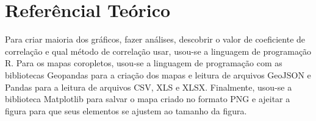 \chapter{Referêncial Teórico}

Para criar maioria dos gráficos, fazer análises, descobrir o valor de coeficiente de correlação e qual método de correlação usar, usou-se a linguagem de programação R. Para os mapas coropletos, usou-se a linguagem de programação com as bibliotecas Geopandas para a criação dos mapas e leitura de arquivos GeoJSON e Pandas para a leitura de arquivos CSV, XLS e XLSX. Finalmente, usou-se a biblioteca  Matplotlib para salvar o mapa criado no formato PNG e ajeitar a figura para que seus elementos se ajustem ao tamanho da figura.